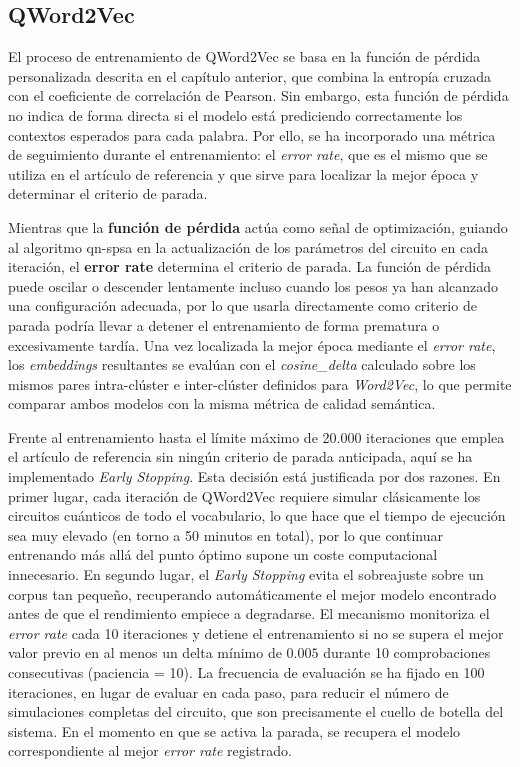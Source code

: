 \subsection{QWord2Vec}

El proceso de entrenamiento de QWord2Vec se basa en la función de pérdida personalizada descrita en el capítulo anterior, que combina la entropía cruzada con el coeficiente de correlación de Pearson. Sin embargo, esta función de pérdida no indica de forma directa si el modelo está prediciendo correctamente los contextos esperados para cada palabra. Por ello, se ha incorporado una métrica de seguimiento durante el entrenamiento: el \textit{error rate}, que es el mismo que se utiliza en el artículo de referencia \cite{ohno_qword2vec_2025} y que sirve para localizar la mejor época y determinar el criterio de parada.

Mientras que la \textbf{función de pérdida} actúa como señal de optimización, guiando al algoritmo \gls{qn-spsa} en la actualización de los parámetros del circuito en cada iteración, el \textbf{error rate} determina el criterio de parada. La función de pérdida puede oscilar o descender lentamente incluso cuando los pesos ya han alcanzado una configuración adecuada, por lo que usarla directamente como criterio de parada podría llevar a detener el entrenamiento de forma prematura o excesivamente tardía. Una vez localizada la mejor época mediante el \textit{error rate}, los \textit{embeddings} resultantes se evalúan con el \textit{cosine\_delta} calculado sobre los mismos pares intra-clúster e inter-clúster definidos para \textit{Word2Vec}, lo que permite comparar ambos modelos con la misma métrica de calidad semántica.

Frente al entrenamiento hasta el límite máximo de 20.000 iteraciones que emplea el artículo de referencia \cite{ohno_qword2vec_2025} sin ningún criterio de parada anticipada, aquí se ha implementado \textit{Early Stopping}. Esta decisión está justificada por dos razones. En primer lugar, cada iteración de QWord2Vec requiere simular clásicamente los circuitos cuánticos de todo el vocabulario, lo que hace que el tiempo de ejecución sea muy elevado (en torno a 50 minutos en total), por lo que continuar entrenando más allá del punto óptimo supone un coste computacional innecesario. En segundo lugar, el \textit{Early Stopping} evita el sobreajuste sobre un corpus tan pequeño, recuperando automáticamente el mejor modelo encontrado antes de que el rendimiento empiece a degradarse. El mecanismo monitoriza el \textit{error rate} cada 10 iteraciones y detiene el entrenamiento si no se supera el mejor valor previo en al menos un delta mínimo de $0.005$ durante 10 comprobaciones consecutivas (paciencia = 10). La frecuencia de evaluación se ha fijado en 100 iteraciones, en lugar de evaluar en cada paso, para reducir el número de simulaciones completas del circuito, que son precisamente el cuello de botella del sistema. En el momento en que se activa la parada, se recupera el modelo correspondiente al mejor \textit{error rate} registrado.

